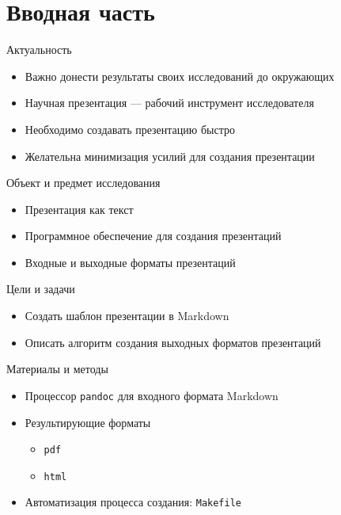 \documentclass[
  ignorenonframetext,
  aspectratio=169,
  russian,
]{beamer}
\providecommand{\tightlist}{%
  \setlength{\itemsep}{0pt}\setlength{\parskip}{0pt}}\usepackage{longtable,booktabs,array}
\begin{document}
\section{Вводная
часть}\label{ux432ux432ux43eux434ux43dux430ux44f-ux447ux430ux441ux442ux44c}

\begin{frame}{Актуальность}
\label{ux430ux43aux442ux443ux430ux43bux44cux43dux43eux441ux442ux44c}
\begin{itemize}[<+->]
\tightlist
\item
  Важно донести результаты своих исследований до окружающих
\item
  Научная презентация --- рабочий инструмент исследователя
\item
  Необходимо создавать презентацию быстро
\item
  Желательна минимизация усилий для создания презентации
\end{itemize}
\end{frame}

\begin{frame}{Объект и предмет исследования}
\label{ux43eux431ux44aux435ux43aux442-ux438-ux43fux440ux435ux434ux43cux435ux442-ux438ux441ux441ux43bux435ux434ux43eux432ux430ux43dux438ux44f}
\begin{itemize}[<+->]
\tightlist
\item
  Презентация как текст
\item
  Программное обеспечение для создания презентаций
\item
  Входные и выходные форматы презентаций
\end{itemize}
\end{frame}

\begin{frame}{Цели и задачи}
\label{ux446ux435ux43bux438-ux438-ux437ux430ux434ux430ux447ux438}
\begin{itemize}[<+->]
\tightlist
\item
  Создать шаблон презентации в Markdown
\item
  Описать алгоритм создания выходных форматов презентаций
\end{itemize}
\end{frame}

\begin{frame}[fragile]{Материалы и методы}
\label{ux43cux430ux442ux435ux440ux438ux430ux43bux44b-ux438-ux43cux435ux442ux43eux434ux44b}
\begin{itemize}[<+->]
\tightlist
\item
  Процессор \texttt{pandoc} для входного формата Markdown
\item
  Результирующие форматы

  \begin{itemize}[<+->]
  \tightlist
  \item
    \texttt{pdf}
  \item
    \texttt{html}
  \end{itemize}
\item
  Автоматизация процесса создания: \texttt{Makefile}
\end{itemize}
\end{frame}
\end{document}

